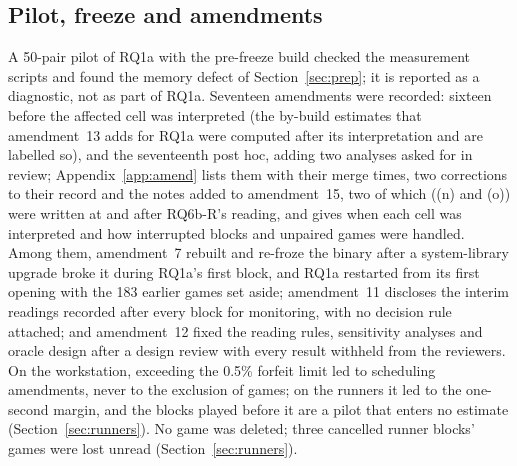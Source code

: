 \documentclass{article}
\begin{document}
\subsection{Pilot, freeze and amendments}
\label{sec:amend}
A 50-pair pilot of RQ1a with the pre-freeze build checked the measurement scripts and found the memory defect of Section~\ref{sec:prep}; it is reported as a diagnostic, not as part of RQ1a. Seventeen amendments were recorded: sixteen before the affected cell was interpreted (the by-build estimates that amendment~13 adds for RQ1a were computed after its interpretation and are labelled so), and the seventeenth post hoc, adding two analyses asked for in review; Appendix~\ref{app:amend} lists them with their merge times, two corrections to their record and the notes added to amendment~15, two of which ((n) and (o)) were written at and after RQ6b-R's reading, and gives when each cell was interpreted and how interrupted blocks and unpaired games were handled. Among them, amendment~7 rebuilt and re-froze the binary after a system-library upgrade broke it during RQ1a's first block, and RQ1a restarted from its first opening with the 183 earlier games set aside; amendment~11 discloses the interim readings recorded after every block for monitoring, with no decision rule attached; and amendment~12 fixed the reading rules, sensitivity analyses and oracle design after a design review with every result withheld from the reviewers. On the workstation, exceeding the 0.5\% forfeit limit led to scheduling amendments, never to the exclusion of games; on the runners it led to the one-second margin, and the blocks played before it are a pilot that enters no estimate (Section~\ref{sec:runners}). No game was deleted; three cancelled runner blocks' games were lost unread (Section~\ref{sec:runners}).
\end{document}
